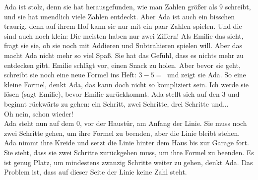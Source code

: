 Ada ist stolz, denn sie hat herausgefunden, wie man Zahlen größer als $9$ schreibt, und sie hat unendlich viele Zahlen entdeckt. 
Aber Ada ist auch ein bisschen traurig, denn auf ihrem Hof kann sie nur mit ein paar Zahlen spielen. Und die sind auch noch klein: Die meisten haben nur zwei Ziffern!
Als Emilie das sieht, fragt sie sie, ob sie noch mit Addieren und Subtrahieren spielen will. 
Aber das macht Ada nicht mehr so viel Spaß. Sie hat das Gefühl, dass es nichts mehr zu entdecken gibt. 
Emilie schlägt vor, einen Snack zu holen. Aber bevor sie geht, schreibt sie noch eine neue Formel ins Heft: $3 - 5 = ~$ und zeigt sie Ada. 
So eine kleine Formel, denkt Ada, das kann doch nicht so kompliziert sein. 
Ich werde sie lösen (sagt Emilie), bevor Emilie zurückkommt. 
Ada stellt sich auf den $3$ und beginnt rückwärts zu gehen: ein Schritt, zwei Schritte, drei Schritte und...\\
\frqq{}Oh nein, schon wieder!\flqq{}\\
Ada steht nun auf dem $0$, vor der Haustür, am Anfang der Linie. 
Sie muss noch zwei Schritte gehen, um ihre Formel zu beenden, aber die Linie bleibt stehen. 
Ada nimmt ihre Kreide und setzt die Linie hinter dem Haus bis zur Garage fort. 
Sie sieht, dass sie zwei Schritte zurückgehen muss, um ihre Formel zu beenden. 
Es ist genug Platz, um mindestens zwanzig Schritte weiter zu gehen, denkt Ada. 
Das Problem ist, dass auf dieser Seite der Linie keine Zahl steht. 

